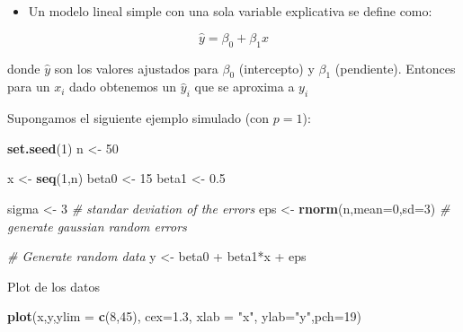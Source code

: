 \documentclass[]{article}
\def\tightlist{}
\newenvironment{Shaded}{\begin{snugshade}}{\end{snugshade}}
\newcommand{\KeywordTok}[1]{\textcolor[rgb]{0.13,0.29,0.53}{\textbf{{#1}}}}
\newcommand{\DataTypeTok}[1]{\textcolor[rgb]{0.13,0.29,0.53}{{#1}}}
\newcommand{\DecValTok}[1]{\textcolor[rgb]{0.00,0.00,0.81}{{#1}}}
\newcommand{\FloatTok}[1]{\textcolor[rgb]{0.00,0.00,0.81}{{#1}}}
\newcommand{\StringTok}[1]{\textcolor[rgb]{0.31,0.60,0.02}{{#1}}}
\newcommand{\CommentTok}[1]{\textcolor[rgb]{0.56,0.35,0.01}{\textit{{#1}}}}
\newcommand{\NormalTok}[1]{{#1}}
\numberwithin{equation}{section}
\begin{document}
\begin{itemize}
\tightlist
\item
  Un modelo lineal simple con una sola variable explicativa se define
  como:
\end{itemize}

\[
         \hat{y} = \beta_0 + \beta_1 x
\]

donde \(\hat y\) son los valores ajustados para \(\beta_0\) (intercepto)
y \(\beta_1\) (pendiente). Entonces para un \(x_i\) dado obtenemos un
\(\hat{y}_i\) que se aproxima a \(y_i\)

Supongamos el siguiente ejemplo simulado (con \(p=1\)):

\begin{Shaded}
\begin{Highlighting}[]
\KeywordTok{set.seed}\NormalTok{(}\DecValTok{1}\NormalTok{)}
\NormalTok{n <-}\StringTok{ }\DecValTok{50} 

\NormalTok{x <-}\StringTok{ }\KeywordTok{seq}\NormalTok{(}\DecValTok{1}\NormalTok{,n)}
 \NormalTok{beta0 <-}\StringTok{ }\DecValTok{15}
 \NormalTok{beta1 <-}\StringTok{ }\FloatTok{0.5}

\NormalTok{sigma <-}\StringTok{ }\DecValTok{3} \CommentTok{# standar deviation of the errors}
\NormalTok{eps <-}\StringTok{ }\KeywordTok{rnorm}\NormalTok{(n,}\DataTypeTok{mean=}\DecValTok{0}\NormalTok{,}\DataTypeTok{sd=}\DecValTok{3}\NormalTok{) }\CommentTok{# generate gaussian random errors}

\CommentTok{# Generate random data}
 \NormalTok{y <-}\StringTok{ }\NormalTok{beta0 +}\StringTok{ }\NormalTok{beta1*x  +}\StringTok{  }\NormalTok{eps}
\end{Highlighting}
\end{Shaded}

Plot de los datos

\begin{Shaded}
\begin{Highlighting}[]
\KeywordTok{plot}\NormalTok{(x,y,}\DataTypeTok{ylim =} \KeywordTok{c}\NormalTok{(}\DecValTok{8}\NormalTok{,}\DecValTok{45}\NormalTok{), }\DataTypeTok{cex=}\FloatTok{1.3}\NormalTok{, }\DataTypeTok{xlab =} \StringTok{"x"}\NormalTok{, }\DataTypeTok{ylab=}\StringTok{"y"}\NormalTok{,}\DataTypeTok{pch=}\DecValTok{19}\NormalTok{)}
\end{Highlighting}
\end{Shaded}
\end{document}
